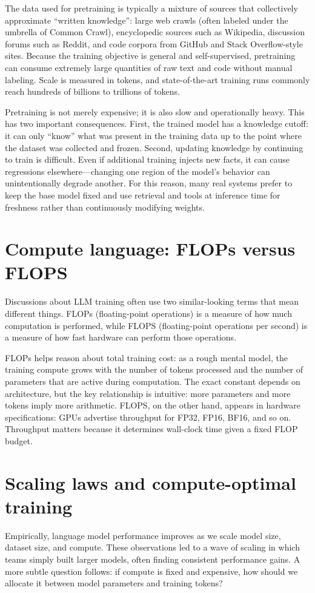 The data used for pretraining is typically a mixture of sources that collectively approximate “written knowledge”: large web crawls (often labeled under the umbrella of Common Crawl), encyclopedic sources such as Wikipedia, discussion forums such as Reddit, and code corpora from GitHub and Stack Overflow-style sites. Because the training objective is general and self-supervised, pretraining can consume extremely large quantities of raw text and code without manual labeling. Scale is measured in tokens, and state-of-the-art training runs commonly reach hundreds of billions to trillions of tokens.

Pretraining is not merely expensive; it is also slow and operationally heavy. This has two important consequences. First, the trained model has a knowledge cutoff: it can only “know” what was present in the training data up to the point where the dataset was collected and frozen. Second, updating knowledge by continuing to train is difficult. Even if additional training injects new facts, it can cause regressions elsewhere—changing one region of the model’s behavior can unintentionally degrade another. For this reason, many real systems prefer to keep the base model fixed and use retrieval and tools at inference time for freshness rather than continuously modifying weights.

\section{Compute language: FLOPs versus FLOPS}
Discussions about LLM training often use two similar-looking terms that mean different things. FLOPs (floating-point operations) is a measure of how much computation is performed, while FLOPS (floating-point operations per second) is a measure of how fast hardware can perform those operations.

FLOPs helps reason about total training cost: as a rough mental model, the training compute grows with the number of tokens processed and the number of parameters that are active during computation. The exact constant depends on architecture, but the key relationship is intuitive: more parameters and more tokens imply more arithmetic. FLOPS, on the other hand, appears in hardware specifications: GPUs advertise throughput for FP32, FP16, BF16, and so on. Throughput matters because it determines wall-clock time given a fixed FLOP budget.

\section{Scaling laws and compute-optimal training}
Empirically, language model performance improves as we scale model size, dataset size, and compute. These observations led to a wave of scaling in which teams simply built larger models, often finding consistent performance gains. A more subtle question follows: if compute is fixed and expensive, how should we allocate it between model parameters and training tokens?

